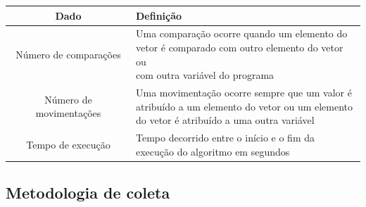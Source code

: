 \begin{table}[H]
    \centering
    \begin{tabular}{ | c | l | }
        \hline
        Dado                    & Definição\\
        \hline
        Número de comparações   & \makecell[l]{Uma comparação ocorre quando um elemento do\\
                                               vetor é comparado com outro elemento do vetor ou\\
                                               com outra variável do programa}\\
        Número de movimentações & \makecell[l]{Uma movimentação ocorre sempre que um valor é\\
                                               atribuído a um elemento do vetor ou um elemento\\
                                               do vetor é atribuído a uma outra variável}\\
        Tempo de execução       & \makecell[l]{Tempo decorrido entre o início e o fim da\\
                                               execução do algoritmo em segundos}\\
        \hline
    \end{tabular}
\end{table}

\subsection{Metodologia de coleta}
